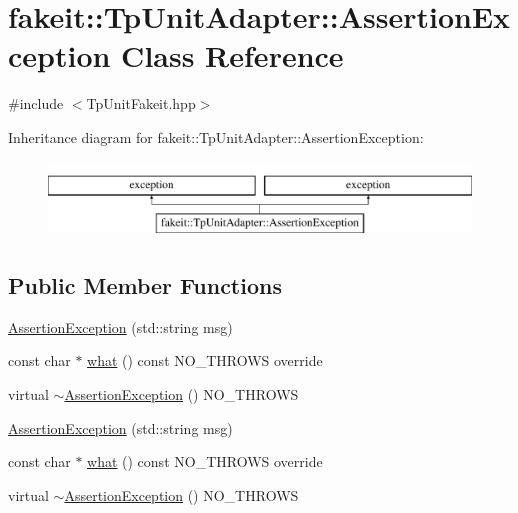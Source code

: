 \hypertarget{classfakeit_1_1TpUnitAdapter_1_1AssertionException}{}\section{fakeit\+::Tp\+Unit\+Adapter\+::Assertion\+Exception Class Reference}
\label{classfakeit_1_1TpUnitAdapter_1_1AssertionException}


{\ttfamily \#include $<$Tp\+Unit\+Fakeit.\+hpp$>$}

Inheritance diagram for fakeit\+::Tp\+Unit\+Adapter\+::Assertion\+Exception\+:\begin{figure}[H]
\begin{center}
\leavevmode
\includegraphics[height=2.000000cm]{classfakeit_1_1TpUnitAdapter_1_1AssertionException}
\end{center}
\end{figure}
\subsection*{Public Member Functions}
\begin{DoxyCompactItemize}
\item 
\mbox{\hyperlink{classfakeit_1_1TpUnitAdapter_1_1AssertionException_ac2fb55b54fa1a05953323ccd3fcb6921}{Assertion\+Exception}} (std\+::string msg)
\item 
const char $\ast$ \mbox{\hyperlink{classfakeit_1_1TpUnitAdapter_1_1AssertionException_af19b3f6451bacf8f7b5b4cc36b2ac0c6}{what}} () const N\+O\+\_\+\+T\+H\+R\+O\+WS override
\item 
virtual \mbox{\hyperlink{classfakeit_1_1TpUnitAdapter_1_1AssertionException_adb281ecc6cec2ff6955f0ee38d22fedc}{$\sim$\+Assertion\+Exception}} () N\+O\+\_\+\+T\+H\+R\+O\+WS
\item 
\mbox{\hyperlink{classfakeit_1_1TpUnitAdapter_1_1AssertionException_ac2fb55b54fa1a05953323ccd3fcb6921}{Assertion\+Exception}} (std\+::string msg)
\item 
const char $\ast$ \mbox{\hyperlink{classfakeit_1_1TpUnitAdapter_1_1AssertionException_af19b3f6451bacf8f7b5b4cc36b2ac0c6}{what}} () const N\+O\+\_\+\+T\+H\+R\+O\+WS override
\item 
virtual \mbox{\hyperlink{classfakeit_1_1TpUnitAdapter_1_1AssertionException_adb281ecc6cec2ff6955f0ee38d22fedc}{$\sim$\+Assertion\+Exception}} () N\+O\+\_\+\+T\+H\+R\+O\+WS
\end{DoxyCompactItemize}


